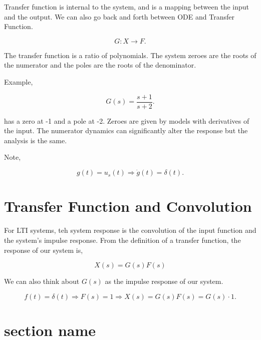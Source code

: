 \documentclass[12pt, a4paper]{report}
\begin{document}
  Transfer function is internal to the system, and is a mapping between the input and the output. We can also go back and forth between ODE and Transfer Function.

  \[
      G: X \rightarrow F
    .\]

  The transfer function is a ratio of polynomials. The system zeroes are the roots of the numerator and the poles are the roots of the denominator.

  Example,

  \[
      G(s) = \frac{s + 1}{s + 2}
    .\]

  has a zero at -1 and a pole at -2. Zeroes are given by models with derivatives of the input. The numerator dynamics can significantly alter the response but the analysis is the same.

  Note,

  \[
      g(t) = u_s(t) \Rightarrow \dot g(t) = \delta (t)
    .\]

  \section{Transfer Function and Convolution}

  For LTI systems, teh system response is the convolution of the input function and the system's impulse response. From the definition of a transfer function, the response of our system is,

  \begin{equation}
    X(s) = G(s)F(s)
  \end{equation}

  We can also think about $ G(s) $ as the impulse response of our system.

  \[
      f(t) = \delta (t) \Rightarrow F(s) = 1 \Rightarrow X(s) = G(s)F(s) = G(s) \cdot 1
    .\]



  \section{section name}
\end{document}
